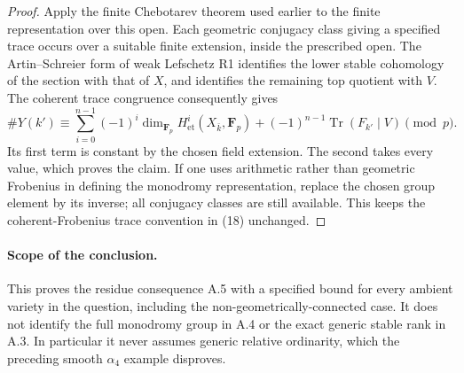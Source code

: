 \begin{proof}
Apply the finite Chebotarev theorem used earlier
\cite[Theorem~9.7.13]{KatzSarnak1999} to the finite
representation over this open.  Each geometric conjugacy
class giving a specified trace occurs over a suitable
finite extension, inside the prescribed open.
The Artin--Schreier form of weak Lefschetz R1 identifies
the lower stable cohomology of the section with that of
$X$, and identifies the remaining top quotient with $V$.
The coherent trace congruence
\cite[Corollary~3.2]{Katz1973Congruence} consequently gives
\[
 \#Y(k')\equiv
  \sum_{i=0}^{n-1}(-1)^i
       \dim_{\mathbf F_p}H^i_{\mathrm{et}}(X_{\bar k},\mathbf F_p)
  +(-1)^{n-1}\operatorname{Tr}(F_{k'}\mid V)\pmod p.
 \tag{18}
\]
Its first term is constant by the chosen field extension.
The second takes every value, which proves the claim.
If one uses arithmetic rather than geometric Frobenius
in defining the monodromy representation, replace the
chosen group element by its inverse; all conjugacy classes
are still available.  This keeps the coherent-Frobenius
trace convention in (18) unchanged.
\end{proof}

\paragraph{Scope of the conclusion.}
This proves the residue consequence A.5 with a specified
bound for every ambient variety in the question, including
the non-geometrically-connected case.  It does not identify
the full monodromy group in A.4 or the exact generic stable
rank in A.3.  In particular it never assumes generic
relative ordinarity, which the preceding smooth
$\alpha_4$ example disproves.

